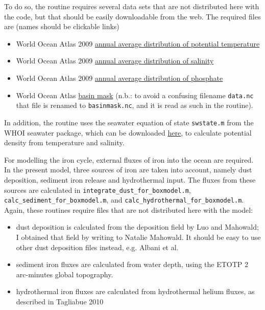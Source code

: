 \documentclass[a4paper]{scrartcl}
\begin{document}
To do so, the routine requires several data sets that are not
distributed here with the code, but that should be easily downloadable
from the web. The required files are (names should be clickable links)
\begin{itemize}
\item World Ocean Atlas 2009
  \href{http://data.nodc.noaa.gov/thredds/fileServer/woa/WOA09/NetCDFdata/temperature_annual_1deg.nc}{annual
    average distribution of potential temperature}
\item World Ocean Atlas 2009
  \href{http://data.nodc.noaa.gov/thredds/fileServer/woa/WOA09/NetCDFdata/salinity_annual_1deg.nc}{annual
    average distribution of salinity}
\item World Ocean Atlas 2009
  \href{http://data.nodc.noaa.gov/thredds/fileServer/woa/WOA09/NetCDFdata/phosphate_annual_1deg.nc}{annual
    average distribution of phosphate}
\item World Ocean Atlas
  \href{http://iridl.ldeo.columbia.edu/SOURCES/.NOAA/.NODC/.WOA09/.Masks/.basin/data.nc}{basin
    mask} (n.b.: to avoid a confusing filename \verb+data.nc+ that
  file is renamed to \verb+basinmask.nc+, and it is read as such in
  the routine).
\end{itemize}
In addition, the routine uses the seawater equation of state \verb+swstate.m+ from the
WHOI seawater package, which can be downloaded
\href{http://mooring.ucsd.edu/software/matlab/doc/toolbox/ocean/swstate.html}{here},
to calculate potential density from temperature and salinity.

For modelling the iron cycle, external fluxes of iron into the ocean
are required. In the present model, three sources of iron are taken
into account, namely dust deposition, sediment iron release and
hydrothermal input. The fluxes from these sources are calculated in
\verb+integrate_dust_for_boxmodel.m+,
\verb+calc_sediment_for_boxmodel.m+, and
\verb+calc_hydrothermal_for_boxmodel.m+. Again, these routines require
files that are not distributed here with the model:
\begin{itemize}
\item dust deposition is calculated from the deposition field by Luo
  and Mahowald; I obtained that field by writing to Natalie
  Mahowald. It should be easy to use other dust deposition files
  instead, e.g. Albani et al.
\item sediment iron fluxes are calculated from water depth, using the
  ETOTP 2 arc-minutes global topography.
\item hydrothermal iron fluxes are calculated from hydrothermal helium
  fluxes, as described in Tagliabue 2010
\end{itemize}
\end{document}
